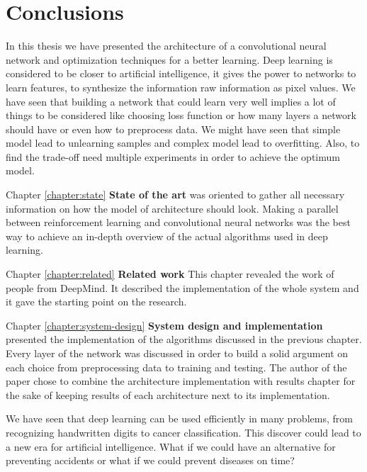 \chapter{Conclusions}
\label{chapter:conclusions}

In this thesis we have presented the architecture of a convolutional neural network and optimization techniques for a better learning. Deep learning is considered to be closer to artificial intelligence, it gives the power to networks to learn features, to synthesize the information raw information as pixel values. We have seen that building a network that could learn very well implies a lot of things to be considered like choosing loss function or how many layers a network should have or even how to preprocess data. We might have seen that simple model lead to unlearning samples and complex model lead to overfitting. Also, to find the trade-off need multiple experiments in order to achieve the optimum model.

Chapter \ref{chapter:state} \textbf{State of the art} was oriented to gather all necessary information on how the model of architecture should look. Making a parallel between reinforcement learning and convolutional neural networks was the best way to achieve an in-depth overview of the actual algorithms used in deep learning.

Chapter \ref{chapter:related} \textbf{Related work} This chapter revealed the work of people from DeepMind. It described the implementation of the whole system and it gave the starting point on the research.

Chapter \ref{chapter:system-design} \textbf{System design and implementation} presented the implementation of the algorithms discussed in the previous chapter. Every layer of the network was discussed in order to build a solid argument on each choice from preprocessing data to training and testing. The author of the paper chose to combine the architecture implementation with results chapter for the sake of keeping results of each architecture next to its implementation.

We have seen that deep learning can be used efficiently in many problems, from recognizing handwritten digits to cancer classification. This discover could lead to a new era for artificial intelligence. What if we could have an alternative for preventing accidents or what if we could prevent diseases on time?
